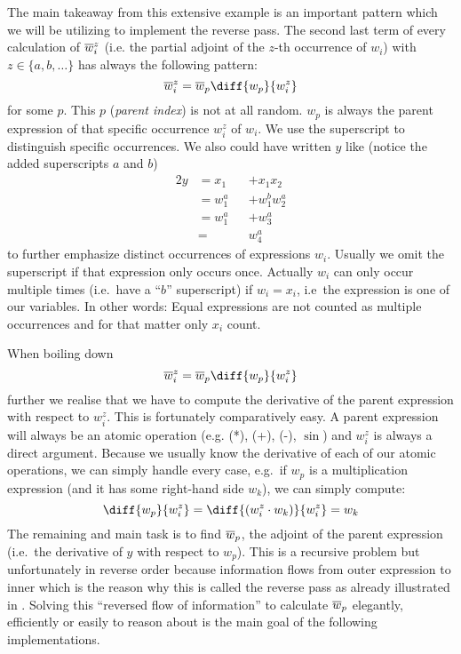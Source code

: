 The main takeaway from this extensive example is an important pattern which we will be utilizing to implement the reverse pass. The second last term of every calculation of $\overline{w}_{i}^z$ (i.e. the partial adjoint of the $z$-th occurrence of $w_i$) with $z \in \{a, b, \dots\}$ has always the following pattern:
\newcommand{\defoverwiz}{\overw{i}^z = \overw{p}\diff{w_p}{w_i^z}}
\[ \defoverwiz \]
for some $p$. This $p$ (\emph{parent index}) is not at all random. $w_p$ is always the parent expression of that specific occurrence $w_i^z$ of $w_i$. We use the superscript to distinguish specific occurrences. We also could have written $y$ like (notice the added superscripts $a$ and $b$)
\begin{alignat*}{2}
    y & = x_1 &  & + x_1 x_2 \\
    & = w_1^a &  & + w_1^b w_2^a \\
    & = w_1^a    &  & + w_3^a       \\
    & =        &  & w_4^a
\end{alignat*}
to further emphasize distinct occurrences of expressions $w_i$. Usually we omit the superscript if that expression only occurs once. Actually $w_i$ can only occur multiple times (i.e.\ have a ``$b$'' superscript) if $w_i = x_i$, i.e\ the expression is one of our variables. In other words: Equal expressions are not counted as multiple occurrences and for that matter only $x_i$ count.

When boiling down
\[ \overw{i}^z = \overw{p}\diff{w_p}{w_i^z}\]
further we realise that we have to compute the derivative of the parent expression with respect to $w_i^z$. This is fortunately comparatively easy. A parent expression will always be an atomic operation (e.g. (*), (+), (-), $\sin$) and $w_i^z$ is always a direct argument. Because we usually know the derivative of each of our atomic operations, we can simply handle every case, e.g.\ if $w_p$ is a multiplication expression (and it has some right-hand side $w_k$), we can simply compute:
\[ \diff{w_p}{w_i^z} = \diff{(w_i^z \cdot w_k)}{w_i^z} = w_k \]
The remaining and main task is to find $\overline{w}_{p}$, the adjoint of the parent expression (i.e.\ the derivative of $y$ with respect to $w_p$). This is a recursive problem but unfortunately in reverse order because information flows from outer expression to inner which is the reason why this is called the reverse pass as already illustrated in . Solving this ``reversed flow of information'' to calculate $\overline{w}_{p}$ elegantly, efficiently or easily to reason about is the main goal of the following implementations.


